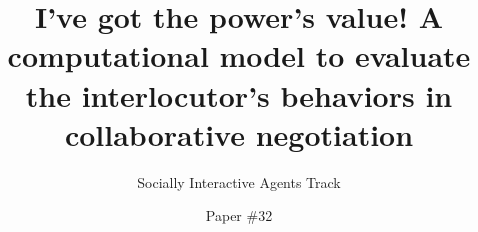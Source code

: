 \documentclass[sigconf]{aamas}  %
\begin{document}
	
	\title{I've got the power's value! A computational model to evaluate the interlocutor's behaviors in collaborative negotiation}  %
	
	\subtitle{Socially Interactive Agents Track}
	
	
	
	\author{Paper \#32}  %
	
	
\end{document}

